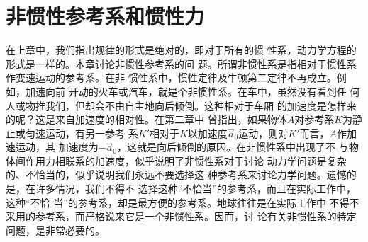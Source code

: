 \documentclass[../outline-of-mechanics.tex]{subfiles}
\begin{document}
\section{非惯性参考系和惯性力}\label{sec:12.01}

在上章中，我们指出规律的形式是绝对的，即对于所有的惯
性系，动力学方程的形式是一样的。本章讨论非惯性参考系的问
题。所谓非惯性系是指相对于惯性系作变速运动的参考系。在非
惯性系中，惯性定律及牛顿第二定律不再成立。例如，加速向前
开动的火车或汽车，就是个非惯性系。在车中，虽然没有看到任
何人或物推我们，但却会不由自主地向后倾倒。这种相对于车厢
的加速度是怎样来的呢？这是来自加速度的相对性。在第二章中
曾指出，如果物体$ A $对参考系$ K $为静止或匀速运动，有另一参考
系$ K' $相对于$ K $以加速度$ \vec{a}_0 $运动，则对$ K ' $而言，$ A $作加速运动，其
加速度为$ - \vec{a} _ { 0 } $，这就是向后倾倒的原因。在非惯性系中出现了不
与物体间作用力相联系的加速度，似乎说明了非惯性系对于讨论
动力学问题是复杂的、不恰当的，似乎说明我们永远不要选择这
种参考系来讨论力学问题。遗憾的是，在许多情况，我们不得不
选择这种“不恰当”的参考系，而且在实际工作中，这种“不恰
当”的参考系，却是最方便的参考系。地球往往是在实际工作中
不得不采用的参考系，而严格说来它是一个非惯性系。因而，讨
论有关非惯性系的特定问题，是非常必要的。
\end{document}
